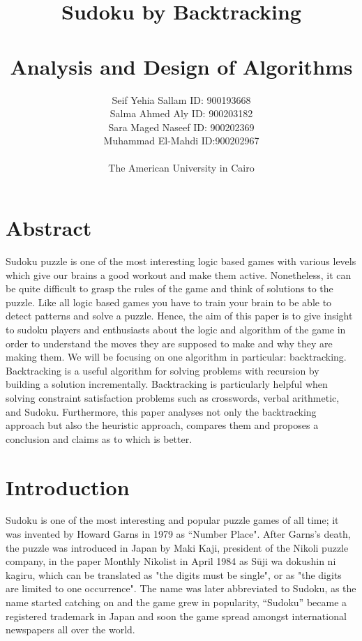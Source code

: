 \documentclass[12pt]{extarticle}
\title{\textbf{Sudoku by Backtracking \\ ~ \\ Analysis and Design of Algorithms}}
\author{Seif Yehia Sallam ID: 900193668 \\ Salma Ahmed Aly ID: 900203182 \\ Sara Maged Naseef ID: 900202369 \\  Muhammad El-Mahdi ID:900202967 \\ ~ \\ The American University in Cairo}
\date{}
\theoremstyle{plain}
\begin{document}
\maketitle
\newpage
\section*{Abstract}
Sudoku puzzle is one of the most interesting logic based games with various levels which give our brains a good workout and make them active. Nonetheless, it can be quite difficult to grasp the rules of the game and think of solutions to the puzzle. Like all logic based games you have to train your brain to be able to detect patterns and solve a puzzle. Hence, the aim of this paper is to give insight to sudoku players and enthusiasts about the logic and algorithm of the game in order to understand the moves they are supposed to make and why they are making them. We will be focusing on one algorithm in particular: backtracking. Backtracking is a useful algorithm for solving problems with recursion by building a solution incrementally. Backtracking is particularly helpful when solving constraint satisfaction problems such as crosswords, verbal arithmetic, and Sudoku. Furthermore, this paper analyses not only the backtracking approach but also the heuristic approach, compares them and proposes a conclusion and claims as to which is better.


\section*{Introduction}
Sudoku is one of the most interesting and popular puzzle games of all time; it was invented by Howard Garns in 1979 as “Number Place". After Garns’s death, the puzzle was introduced in Japan by Maki Kaji, president of the Nikoli puzzle company, in the paper Monthly Nikolist in April 1984 as Sūji wa dokushin ni kagiru, which can be translated as "the digits must be single", or as "the digits are limited to one occurrence". The name was later abbreviated to Sudoku, as the name started catching on and the game grew in popularity, “Sudoku” became a registered trademark in Japan and soon the game spread amongst international newspapers all over the world.
\end{document}
